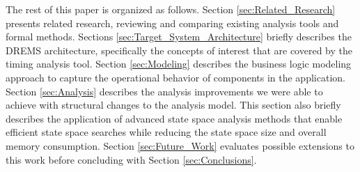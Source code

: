 The rest of this paper is organized as follows. Section \ref{sec:Related_Research} presents related research, reviewing and comparing existing analysis tools and formal methods. Sections \ref{sec:Target_System_Architecture} briefly describes the DREMS architecture, specifically the concepts of interest that are covered by the timing analysis tool. Section \ref{sec:Modeling} describes the business logic modeling approach to capture the operational behavior of components in the application. Section \ref{sec:Analysis} describes the analysis improvements we were able to achieve with structural changes to the analysis model. This section also briefly describes the application of advanced state space analysis methods that enable efficient state space searches while reducing the state space size and overall memory consumption. Section \ref{sec:Future_Work} evaluates possible extensions to this work before concluding with Section \ref{sec:Conclusions}.